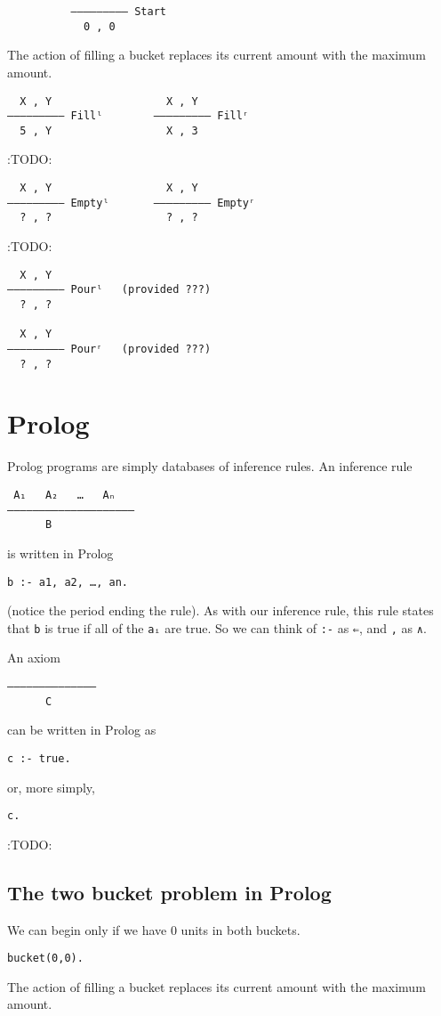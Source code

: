 \documentclass[11pt]{article}
\begin{document}
\begin{enumerate}
\begin{verbatim}
          ––––––––— Start
            0 , 0
\end{verbatim}

The action of filling a bucket replaces its current amount
with the maximum amount.
\begin{verbatim}
  X , Y                  X , Y
––––––––— Fillˡ        ––––––––– Fillʳ
  5 , Y                  X , 3
\end{verbatim}

:TODO:
\begin{verbatim}
  X , Y                  X , Y
––––––––— Emptyˡ       ––––––––– Emptyʳ
  ? , ?                  ? , ?  
\end{verbatim}

:TODO:
\begin{verbatim}
  X , Y        
––––––––— Pourˡ   (provided ???)
  ? , ?        

  X , Y        
––––––––– Pourʳ   (provided ???)
  ? , ?
\end{verbatim}
\end{enumerate}
\section{Prolog}
\label{sec:org24a924d}
Prolog programs are simply databases of inference rules.
An inference rule
\begin{verbatim}
 A₁   A₂   …   Aₙ
––––––––––––––––––––
      B
\end{verbatim}
is written in Prolog
\begin{verbatim}
b :- a1, a2, …, an.
\end{verbatim}
(notice the period ending the rule).
As with our inference rule, this rule states that
\texttt{b} is true if all of the \texttt{aᵢ} are true.
So we can think of \texttt{:-} as \texttt{⇐}, and \texttt{,} as \texttt{∧}.

An axiom
\begin{verbatim}
––––––––––––––
      C
\end{verbatim}
can be written in Prolog as
\begin{verbatim}
c :- true.
\end{verbatim}
or, more simply,
\begin{verbatim}
c.
\end{verbatim}

:TODO:

\subsection{The two bucket problem in Prolog}
\label{sec:org0563ba6}
We can begin only if we have 0 units in both buckets.
\begin{verbatim}
bucket(0,0).
\end{verbatim}

The action of filling a bucket replaces its current amount
with the maximum amount.
\end{document}
